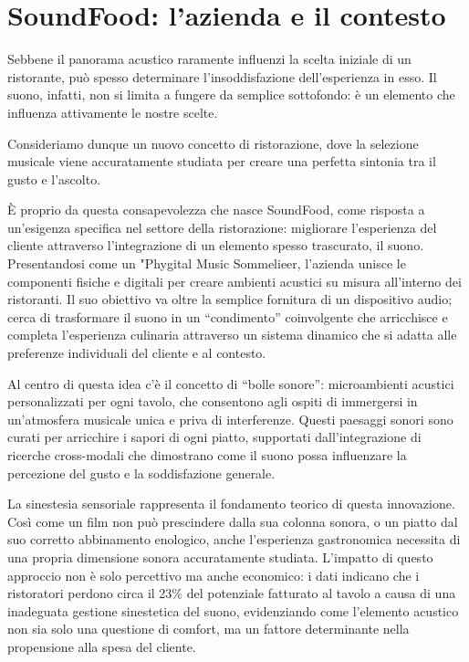 
%

\chapter{SoundFood: {l'azienda e il contesto}}


Sebbene il panorama acustico raramente influenzi la scelta iniziale di un ristorante, può spesso determinare l'insoddisfazione dell'esperienza in esso. Il suono, infatti, non si limita a fungere da semplice sottofondo: è un elemento che influenza attivamente le nostre scelte.

Consideriamo dunque un nuovo concetto di ristorazione, dove la selezione musicale viene accuratamente studiata per creare una perfetta sintonia tra il gusto e l'ascolto.

È proprio da questa consapevolezza che nasce SoundFood, come risposta a un'esigenza specifica nel settore della ristorazione: migliorare l'esperienza del cliente attraverso l'integrazione di un elemento  spesso trascurato, il suono. Presentandosi come un "Phygital Music Sommelieer, l'azienda unisce le componenti fisiche e digitali per creare ambienti acustici su misura all'interno dei ristoranti. Il suo obiettivo va oltre la semplice fornitura di un dispositivo audio; cerca di trasformare il suono in un “condimento” coinvolgente che arricchisce e completa l'esperienza culinaria attraverso un sistema  dinamico che si adatta alle preferenze individuali del cliente e al contesto. \cite{soundfood2016}

Al centro di questa idea c’è il concetto di “bolle sonore”: microambienti acustici personalizzati per ogni tavolo, che consentono agli ospiti di immergersi in un'atmosfera musicale unica e priva di interferenze. Questi paesaggi sonori sono curati per arricchire i sapori di ogni piatto, supportati dall’integrazione di ricerche cross-modali che dimostrano come il suono possa influenzare la percezione del gusto e la soddisfazione generale.

La sinestesia sensoriale rappresenta il fondamento teorico di questa innovazione. Così come un film non può prescindere dalla sua colonna sonora, o un piatto dal suo corretto abbinamento enologico, anche l'esperienza gastronomica necessita di una propria dimensione sonora accuratamente studiata. L'impatto di questo approccio non è solo percettivo ma anche economico: i dati indicano che i ristoratori perdono circa il 23\% del potenziale fatturato al tavolo a causa di una inadeguata gestione sinestetica del suono, evidenziando come l'elemento acustico non sia solo una questione di comfort, ma un fattore determinante nella propensione alla spesa del cliente. \cite{negreira2019acoustics}

